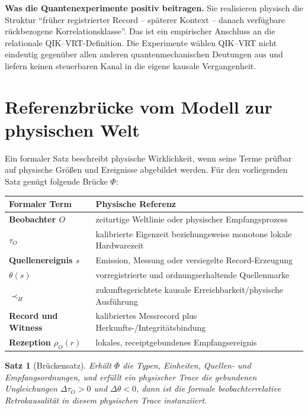 \documentclass[11pt,a4paper]{article}
\newtheorem{satz}{Satz}[section]
\theoremstyle{remark}
\newcommand{\host}{\prec_{\!H}}
\newcommand{\statusbox}[2]{%
  \par\medskip\noindent
  \colorbox{#1}{\parbox{\dimexpr\linewidth-2\fboxsep\relax}{#2}}%
  \par\medskip
}
\begin{document}
\statusbox{QAmber}{
  \textbf{Was die Quantenexperimente positiv beitragen.}
  Sie realisieren physisch die Struktur ``früher registrierter Record --
  späterer Kontext -- danach verfügbare rückbezogene Korrelationsklasse''.
  Das ist ein empirischer Anschluss an die relationale QIK--VRT-Definition.
  Die Experimente wählen QIK--VRT nicht eindeutig gegenüber allen anderen
  quantenmechanischen Deutungen aus und liefern keinen steuerbaren Kanal in
  die eigene kausale Vergangenheit.
}

\section{Referenzbrücke vom Modell zur physischen Welt}

Ein formaler Satz beschreibt physische Wirklichkeit, wenn seine Terme
prüfbar auf physische Größen und Ereignisse abgebildet werden. Für den
vorliegenden Satz genügt folgende Brücke \(\Phi\):

\begin{center}
\begin{tabularx}{\textwidth}{>{\bfseries}p{}X}
\toprule
Formaler Term & Physische Referenz \\
\midrule
Beobachter \(O\) & zeitartige Weltlinie oder physischer Empfangsprozess \\
\(\tau_O\) & kalibrierte Eigenzeit beziehungsweise monotone lokale Hardwarezeit \\
Quellenereignis \(s\) & Emission, Messung oder versiegelte Record-Erzeugung \\
\(\theta(s)\) & vorregistrierte und ordnungserhaltende Quellenmarke \\
\(\host\) & zukunftsgerichtete kausale Erreichbarkeit/physische Ausführung \\
Record und Witness & kalibriertes Messrecord plus Herkunfts-/Integritätsbindung \\
Rezeption \(\rho_O(r)\) & lokales, receiptgebundenes Empfangsereignis \\
\bottomrule
\end{tabularx}
\end{center}

\begin{satz}[Brückensatz]
Erhält \(\Phi\) die Typen, Einheiten, Quellen- und Empfangsordnungen, und
erfüllt ein physischer Trace die gebundenen Ungleichungen
\(\Delta\tau_O>0\) und \(\Delta\theta<0\), dann ist die formale
beobachterrelative Retrokausalität in diesem physischen Trace instanziiert.
\end{satz}
\end{document}
